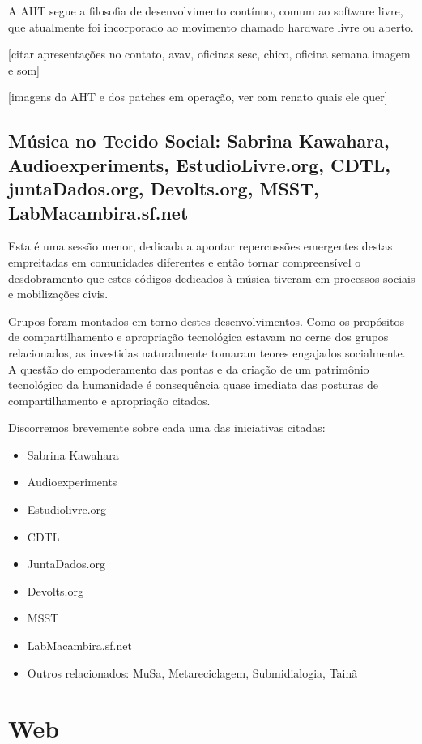 A AHT segue a filosofia de desenvolvimento contínuo, comum ao software
livre, que atualmente foi incorporado ao movimento chamado hardware
livre ou aberto.

[citar apresentações no contato, avav, oficinas sesc, chico, oficina semana imagem e som]

[imagens da AHT e dos patches em operação, ver com renato quais ele quer]

\subsection{Música no Tecido Social: Sabrina Kawahara, Audioexperiments, EstudioLivre.org, CDTL, juntaDados.org, Devolts.org, MSST, LabMacambira.sf.net}

Esta é uma sessão menor, dedicada a apontar repercussões emergentes
destas empreitadas em comunidades diferentes e então tornar
compreensível o desdobramento que estes códigos dedicados à música
tiveram em processos sociais e mobilizações civis.

Grupos foram montados em torno destes desenvolvimentos. Como os
propósitos de compartilhamento e apropriação tecnológica estavam no
cerne dos grupos relacionados, as investidas naturalmente tomaram
teores engajados socialmente. A questão do empoderamento das pontas e
da criação de um patrimônio tecnológico da humanidade é consequência
quase imediata das posturas de compartilhamento e apropriação citados.

Discorremos brevemente sobre cada uma das iniciativas citadas:

\begin{itemize}
    \item Sabrina Kawahara
    \item Audioexperiments
    \item Estudiolivre.org
    \item CDTL
    \item JuntaDados.org
    \item Devolts.org
    \item MSST
    \item LabMacambira.sf.net
    \item Outros relacionados: MuSa, Metareciclagem, Submidialogia, Tainã
\end{itemize}

\section{Web}

